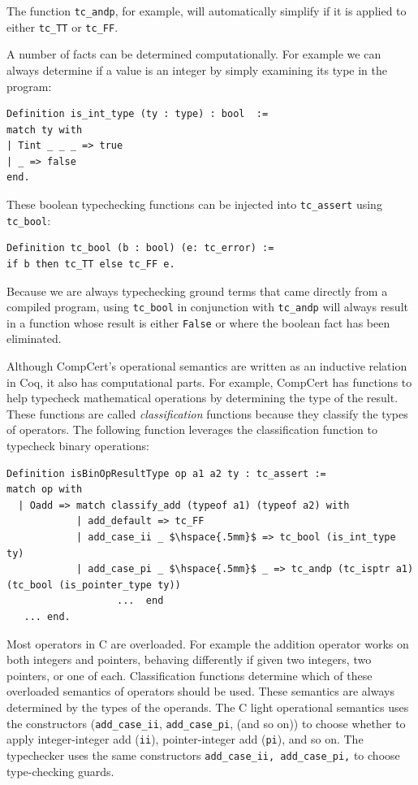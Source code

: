 \documentclass{puthesis}
\begin{document}
The function \lstinline|tc_andp|, for example, will automatically
simplify if it is applied to either \lstinline|tc_TT| or
\lstinline|tc_FF|. 

A number of facts can be determined computationally. For example we
can always determine if a value is an integer by simply examining its
type in the program: 

\begin{lstlisting}
Definition is_int_type (ty : type) : bool  := 
match ty with
| Tint _ _ _ => true
| _ => false
end.
\end{lstlisting}

These boolean typechecking functions can be injected into
\lstinline|tc_assert| using \lstinline|tc_bool|:

\begin{lstlisting}
Definition tc_bool (b : bool) (e: tc_error) :=
if b then tc_TT else tc_FF e.
\end{lstlisting}

Because we are always typechecking ground terms that came directly
from a compiled program, using \lstinline|tc_bool| in conjunction with
\lstinline|tc_andp| will always result in a function whose result is
either \lstinline|False| or where the boolean fact has been eliminated.

Although CompCert's operational semantics are written as an inductive
relation in Coq, it also has computational parts. For example,
CompCert has functions to help typecheck mathematical
operations by determining the type of the result. These functions are
called \emph{classification} functions because they classify the types
of operators. The following
function leverages the classification function to typecheck binary
operations:

\begin{lstlisting}
Definition isBinOpResultType op a1 a2 ty : tc_assert :=
match op with
  | Oadd => match classify_add (typeof a1) (typeof a2) with 
            | add_default => tc_FF
            | add_case_ii _ $\hspace{.5mm}$ => tc_bool (is_int_type ty) 
            | add_case_pi _ $\hspace{.5mm}$ _ => tc_andp (tc_isptr a1) (tc_bool (is_pointer_type ty)) 
                   ...  end   
   ... end.
\end{lstlisting}

Most operators in C are overloaded. For example the addition operator
works on both integers and pointers, behaving differently if given two
integers, two pointers, or one of each.  Classification functions
determine which of these overloaded semantics of operators should be
used. These semantics are always determined by the types of the
operands.  The C light operational semantics uses the constructors
(\lstinline|add_case_ii|, \lstinline|add_case_pi|, (and so on)) to
choose whether to apply integer-integer add (\lstinline|ii|),
pointer-integer add (\lstinline|pi|), and so on.  The typechecker uses
the same constructors \lstinline{add_case_ii, add_case_pi,} to choose
type-checking guards.
\end{document}
